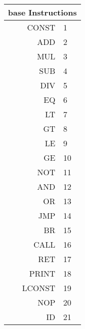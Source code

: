 \begin{tabular}{|r|l|}\hline
\multicolumn{2}{|c|}{base Instructions}\\ \hline
CONST & 1 \\ \hline
ADD & 2 \\ \hline
MUL & 3 \\ \hline
SUB & 4 \\ \hline
DIV & 5 \\ \hline
EQ & 6 \\ \hline
LT & 7 \\ \hline
GT & 8 \\ \hline
LE & 9 \\ \hline
GE & 10 \\ \hline
NOT & 11 \\ \hline
AND & 12 \\ \hline
OR & 13 \\ \hline
JMP & 14 \\ \hline
BR & 15 \\ \hline
CALL & 16 \\ \hline
RET & 17 \\ \hline
PRINT & 18 \\ \hline
LCONST & 19 \\ \hline
NOP & 20 \\ \hline
ID & 21 \\ \hline
\end{tabular}
